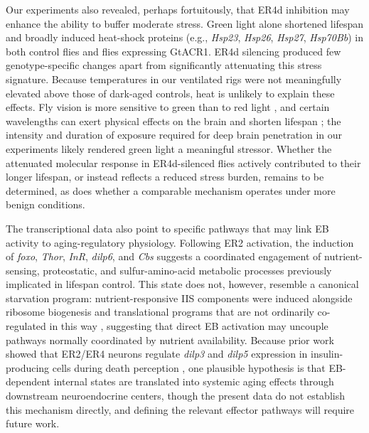 Our experiments also revealed, perhaps fortuitously, that ER4d inhibition may enhance the ability to buffer moderate stress.
Green light alone shortened lifespan and broadly induced heat-shock proteins (e.g., \textit{Hsp23}, \textit{Hsp26}, \textit{Hsp27}, \textit{Hsp70Bb}) in both control flies and flies expressing GtACR1.
ER4d silencing produced few genotype-specific changes apart from significantly attenuating this stress signature.
Because temperatures in our ventilated rigs were not meaningfully elevated above those of dark-aged controls, heat is unlikely to explain these effects.
Fly vision is more sensitive to green than to red light \citep{salcedo1999}, and certain wavelengths can exert physical effects on the brain \citep{song2022} and shorten lifespan \citep{johnson2023}; the intensity and duration of exposure required for deep brain penetration in our experiments \citep{wolff2015} likely rendered green light a meaningful stressor.
Whether the attenuated molecular response in ER4d-silenced flies actively contributed to their longer lifespan, or instead reflects a reduced stress burden, remains to be determined, as does whether a comparable mechanism operates under more benign conditions.

The transcriptional data also point to specific pathways that may link EB activity to aging-regulatory physiology.
Following ER2 activation, the induction of \textit{foxo}, \textit{Thor}, \textit{InR}, \textit{dilp6}, and \textit{Cbs} suggests a coordinated engagement of nutrient-sensing, proteostatic, and sulfur-amino-acid metabolic processes previously implicated in lifespan control.
This state does not, however, resemble a canonical starvation program: nutrient-responsive IIS components were induced alongside ribosome biogenesis and translational programs that are not ordinarily co-regulated in this way \citep{essers2016}, suggesting that direct EB activation may uncouple pathways normally coordinated by nutrient availability.
Because prior work showed that ER2/ER4 neurons regulate \textit{dilp3} and \textit{dilp5} expression in insulin-producing cells during death perception \citep{gendron2023}, one plausible hypothesis is that EB-dependent internal states are translated into systemic aging effects through downstream neuroendocrine centers, though the present data do not establish this mechanism directly, and defining the relevant effector pathways will require future work.

